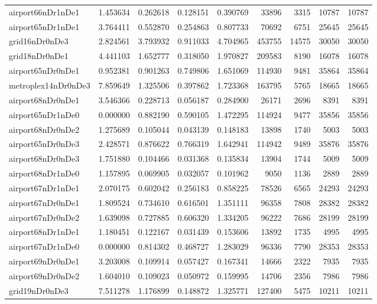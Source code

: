 \documentclass[../../../thesis.tex]{subfiles}
\begin{document}
\begin{longtable}{|l|r|r|r|r|r|r|r|r|}
airport66nDr1nDe1 & 1.453634 & 0.262618 & 0.128151 & 0.390769 & 33896 & 3315 & 10787 & 10787 \\
airport65nDr1nDe1 & 3.764411 & 0.552870 & 0.254863 & 0.807733 & 70692 & 6751 & 25645 & 25645 \\
grid16nDr0nDe3 & 2.824561 & 3.793932 & 0.911033 & 4.704965 & 453755 & 14575 & 30050 & 30050 \\
grid18nDr0nDe1 & 4.441103 & 1.652777 & 0.318050 & 1.970827 & 209583 & 8190 & 16078 & 16078 \\
airport65nDr0nDe1 & 0.952381 & 0.901263 & 0.749806 & 1.651069 & 114930 & 9481 & 35864 & 35864 \\
metroplex14nDr0nDe3 & 7.859649 & 1.325506 & 0.397862 & 1.723368 & 163795 & 5765 & 18665 & 18665 \\
airport68nDr0nDe1 & 3.546366 & 0.228713 & 0.056187 & 0.284900 & 26171 & 2696 & 8391 & 8391 \\
airport65nDr1nDe0 & 0.000000 & 0.882190 & 0.590105 & 1.472295 & 114924 & 9477 & 35856 & 35856 \\
airport68nDr0nDe2 & 1.275689 & 0.105044 & 0.043139 & 0.148183 & 13898 & 1740 & 5003 & 5003 \\
airport65nDr0nDe3 & 2.428571 & 0.876622 & 0.766319 & 1.642941 & 114942 & 9489 & 35876 & 35876 \\
airport68nDr0nDe3 & 1.751880 & 0.104466 & 0.031368 & 0.135834 & 13904 & 1744 & 5009 & 5009 \\
airport68nDr1nDe0 & 1.157895 & 0.069905 & 0.032057 & 0.101962 & 9050 & 1136 & 2889 & 2889 \\
airport67nDr1nDe1 & 2.070175 & 0.602042 & 0.256183 & 0.858225 & 78526 & 6565 & 24293 & 24293 \\
airport67nDr0nDe1 & 1.809524 & 0.734610 & 0.616501 & 1.351111 & 96358 & 7808 & 28382 & 28382 \\
airport67nDr0nDe2 & 1.639098 & 0.727885 & 0.606320 & 1.334205 & 96222 & 7686 & 28199 & 28199 \\
airport68nDr1nDe1 & 1.180451 & 0.122167 & 0.031439 & 0.153606 & 13892 & 1735 & 4995 & 4995 \\
airport67nDr1nDe0 & 0.000000 & 0.814302 & 0.468727 & 1.283029 & 96336 & 7790 & 28353 & 28353 \\
airport69nDr0nDe1 & 3.203008 & 0.109914 & 0.057427 & 0.167341 & 14666 & 2322 & 7935 & 7935 \\
airport69nDr0nDe2 & 1.604010 & 0.109023 & 0.050972 & 0.159995 & 14706 & 2356 & 7986 & 7986 \\
grid19nDr0nDe3 & 7.511278 & 1.176899 & 0.148872 & 1.325771 & 127400 & 5475 & 10211 & 10211 \\

\end{longtable}
\end{document}
